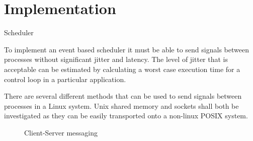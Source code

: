 \chapter{Implementation}






Scheduler

To implement an event based scheduler it must be able to send signals between processes without significant jitter and latency. The level of jitter that is acceptable can be estimated by calculating a worst case execution time for a control loop in a particular application.

There are several different methods that can be used to send signals between processes in a Linux system. Unix shared memory and sockets shall both be investigated as they can be easily transported onto a non-linux POSIX system.




\begin{figure}[ht]
    \centering
    \begin{sequencediagram}




    \end{sequencediagram}
    \caption{Client-Server messaging}
\end{figure}